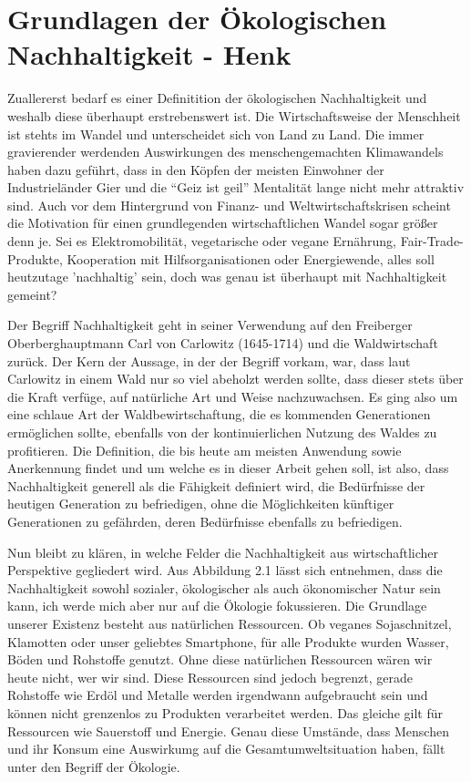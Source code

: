 \chapter{Grundlagen der Ökologischen Nachhaltigkeit - Henk}
Zuallererst bedarf es einer Definitition der ökologischen Nachhaltigkeit und weshalb diese überhaupt erstrebenswert ist. Die Wirtschaftsweise der Menschheit ist stehts im Wandel und unterscheidet sich von Land zu Land. Die immer gravierender werdenden Auswirkungen des menschengemachten Klimawandels haben dazu geführt, dass in den Köpfen der meisten Einwohner der Industrieländer Gier und die ``Geiz ist geil'' Mentalität lange nicht mehr attraktiv sind. Auch vor dem Hintergrund von Finanz- und Weltwirtschaftskrisen scheint die Motivation für einen grundlegenden wirtschaftlichen Wandel sogar größer denn je. Sei es Elektromobilität, vegetarische oder vegane Ernährung, Fair-Trade-Produkte, Kooperation mit Hilfsorganisationen oder Energiewende, alles soll heutzutage 'nachhaltig' sein, doch was genau ist überhaupt mit Nachhaltigkeit gemeint?

Der Begriff Nachhaltigkeit geht in seiner Verwendung auf den Freiberger Oberberghauptmann Carl von Carlowitz (1645-1714) und die Waldwirtschaft zurück\cite{doi:nachhaltig}. Der Kern der Aussage, in der der Begriff vorkam, war, dass laut Carlowitz in einem Wald nur so viel abeholzt werden sollte, dass dieser stets über die Kraft verfüge, auf natürliche Art und Weise nachzuwachsen. Es ging also um eine schlaue Art der Waldbewirtschaftung, die es kommenden Generationen ermöglichen sollte, ebenfalls von der kontinuierlichen Nutzung des Waldes zu profitieren. Die Definition, die bis heute am meisten Anwendung sowie Anerkennung findet und um welche es in dieser Arbeit gehen soll, ist also, dass Nachhaltigkeit generell als die Fähigkeit definiert wird, die Bedürfnisse der heutigen Generation zu befriedigen, ohne die Möglichkeiten künftiger Generationen zu gefährden, deren Bedürfnisse ebenfalls zu befriedigen.

Nun bleibt zu klären, in welche Felder die Nachhaltigkeit aus wirtschaftlicher Perspektive gegliedert wird. Aus Abbildung 2.1 lässt sich entnehmen, dass die Nachhaltigkeit sowohl sozialer, ökologischer als auch ökonomischer Natur sein kann, ich werde mich aber nur auf die Ökologie fokussieren.\clearpage
 Die Grundlage unserer Existenz besteht aus natürlichen Ressourcen. Ob veganes Sojaschnitzel, Klamotten oder unser geliebtes Smartphone, für alle Produkte wurden Wasser, Böden und Rohstoffe genutzt. Ohne diese natürlichen Ressourcen wären wir heute nicht, wer wir sind. Diese Ressourcen sind jedoch begrenzt, gerade Rohstoffe wie Erdöl und Metalle werden irgendwann aufgebraucht sein und können nicht grenzenlos zu Produkten verarbeitet werden. Das gleiche gilt für Ressourcen wie Sauerstoff und Energie. Genau diese Umstände, dass Menschen und ihr Konsum eine Auswirkumg auf die Gesamtumweltsituation haben, fällt unter den Begriff der Ökologie. 

